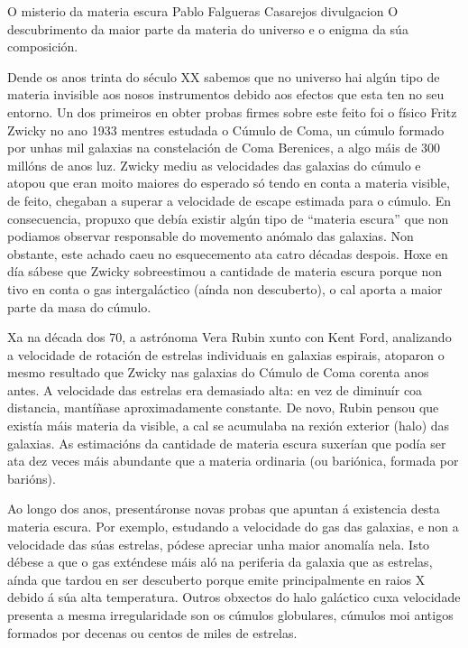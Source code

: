 \Titular%
{O misterio da materia escura}%
{Pablo Falgueras Casarejos}%
{divulgacion}%
{O descubrimento da maior parte da materia do universo e o enigma da súa composición.}%


\begin{refsection}


\begin{multicols}{2}


Dende os anos trinta do século XX sabemos que no universo hai algún tipo de materia invisible aos nosos instrumentos debido aos efectos que esta ten no seu entorno. Un dos primeiros en obter probas firmes sobre este feito foi o físico Fritz Zwicky no ano 1933 mentres estudada o Cúmulo de Coma, un cúmulo formado por unhas mil galaxias na constelación de Coma Berenices, a algo máis de 300 millóns de anos luz. Zwicky mediu as velocidades das galaxias do cúmulo e atopou que eran moito maiores do esperado só tendo en conta a materia visible, de feito, chegaban a superar a velocidade de escape estimada para o cúmulo. En consecuencia, propuxo que debía existir algún tipo de “materia escura” que non podiamos observar responsable do movemento anómalo das galaxias. Non obstante, este achado caeu no esquecemento ata catro décadas despois. Hoxe en día sábese que Zwicky sobreestimou a cantidade de materia escura porque non tivo en conta o gas intergaláctico (aínda non descuberto), o cal aporta a maior parte da masa do cúmulo. 

Xa na década dos 70, a astrónoma Vera Rubin xunto con Kent Ford, analizando a velocidade de rotación de estrelas individuais en galaxias espirais, atoparon o mesmo resultado que Zwicky nas galaxias do Cúmulo de Coma corenta anos antes. A velocidade das estrelas era demasiado alta: en vez de diminuír coa distancia, mantíñase aproximadamente constante. De novo, Rubin pensou que existía máis materia da visible, a cal se acumulaba na rexión exterior (halo) das galaxias. As estimacións da cantidade de materia escura suxerían que podía ser ata dez veces máis abundante que a materia ordinaria (ou bariónica, formada por barións).

Ao longo dos anos, presentáronse novas probas que apuntan á existencia desta materia escura. Por exemplo, estudando a velocidade do gas das galaxias, e non a velocidade das súas estrelas, pódese apreciar unha maior anomalía nela. Isto débese a que o gas exténdese máis aló na periferia da galaxia que as estrelas, aínda que tardou en ser descuberto porque emite principalmente en raios X debido á súa alta temperatura. Outros obxectos do halo galáctico cuxa velocidade presenta a mesma irregularidade son os cúmulos globulares, cúmulos moi antigos formados por decenas ou centos de miles de estrelas.


\end{multicols}
\end{refsection}
